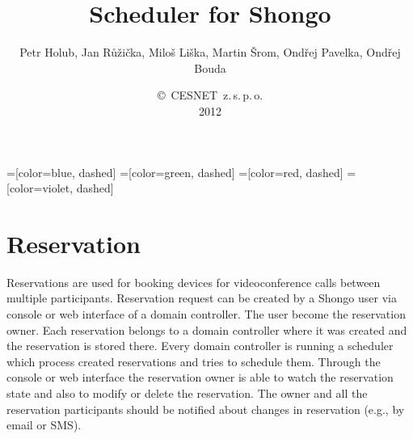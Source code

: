 \documentclass[a4paper]{report}
\begin{document}
\title{Scheduler for Shongo}
\author{Petr Holub, Jan Růžička, Miloš Liška, Martin Šrom, Ondřej Pavelka, 
        Ondřej Bouda}
\date{\copyright~CESNET~z.\,s.\,p.\,o.\\2012}
\maketitle
\tableofcontents

=[color=blue, dashed]
=[color=green, dashed]
=[color=red, dashed]
=[color=violet, dashed]





\chapter{Reservation}

Reservations are used for booking devices for videoconference calls between multiple participants. Reservation request can be created by a Shongo user via console or web interface of a domain controller. The user become the reservation owner. Each reservation belongs to a domain controller where it was created and the reservation is stored there. Every domain controller is running a scheduler which process created reservations and tries to schedule them. Through the console or web interface the reservation owner is able to watch the reservation state and also to modify or delete the reservation. The owner and all the reservation participants should be notified about changes in reservation (e.g., by email or SMS). 
\end{document}
